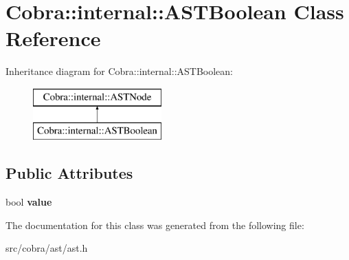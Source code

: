\hypertarget{class_cobra_1_1internal_1_1_a_s_t_boolean}{\section{Cobra\+:\+:internal\+:\+:A\+S\+T\+Boolean Class Reference}
\label{class_cobra_1_1internal_1_1_a_s_t_boolean}
}
Inheritance diagram for Cobra\+:\+:internal\+:\+:A\+S\+T\+Boolean\+:\begin{figure}[H]
\begin{center}
\leavevmode
\includegraphics[height=2.000000cm]{class_cobra_1_1internal_1_1_a_s_t_boolean}
\end{center}
\end{figure}
\subsection*{Public Attributes}
\begin{DoxyCompactItemize}
\item 
\hypertarget{class_cobra_1_1internal_1_1_a_s_t_boolean_a029bb02b49553aee23445512eb57afa0}{bool {\bfseries value}}\label{class_cobra_1_1internal_1_1_a_s_t_boolean_a029bb02b49553aee23445512eb57afa0}

\end{DoxyCompactItemize}


The documentation for this class was generated from the following file\+:\begin{DoxyCompactItemize}
\item 
src/cobra/ast/ast.\+h\end{DoxyCompactItemize}
